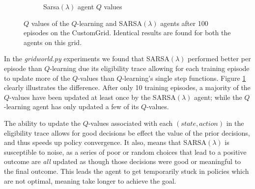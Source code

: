 \documentclass[10pt,conference]{IEEEtran}
\begin{document}
\begin{figure}[h]
\begin{subfigure}[b]{0.25\textwidth}
			\caption{Sarsa\((\lambda)\) agent \(Q\) values}
		\end{subfigure}
		\caption{\(Q\) values of the \(Q\)-learning and SARSA\((\lambda)\) agents 
		after 100 episodes on the CustomGrid. Identical results are found for both the agents on this grid.}
		\label{qvalues}
	\end{figure}

	In the \textit{gridworld.py} experiments we found that SARSA\((\lambda)\) 
	performed better per episode than \(Q\)-learning due its eligibility trace allowing for
	each training episode to update more of the \(Q\)-values than \(Q\)-learning's
	single step functions. Figure \ref{qvalues} clearly illustrates the difference. 
	After only 10 training episodes, a majority of the \(Q\)-values have been
	updated at least once by the SARSA\((\lambda)\) agent; while the \(Q\)-learning
	agent has only updated a few of its \(Q\)-values.

	The ability to update the \(Q\)-values associated with each \((state,action)\) 
	in the eligibility trace allows for good decisions be effect the value of the 
	prior decisions, and thus speeds up policy convergence.  It also, means that
	SARSA\((\lambda)\) is susceptible to noise, as a series of poor or random choices 
	that lead to a positive outcome are \textit{all} updated as though those 
	decisions were good or meaningful to the final outcome.  This leads the agent
	to get temporarily stuck in policies which are not optimal, meaning take longer
	to achieve the goal.
\end{document}
